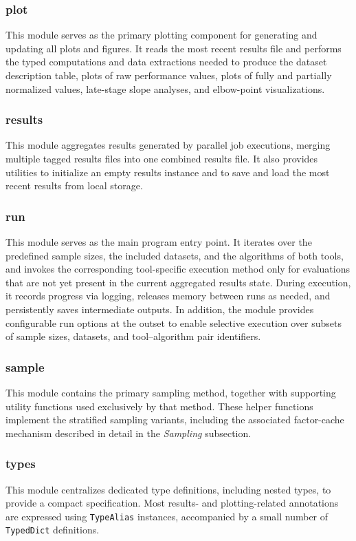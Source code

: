 \documentclass[12pt,a4paper]{article}
\begin{document}
\subsubsection{plot}
This module serves as the primary plotting component for generating and updating all plots and figures. It reads the most recent results file and performs the typed computations and data extractions needed to produce the dataset description table, plots of raw performance values, plots of fully and partially normalized values, late-stage slope analyses, and elbow-point visualizations.

\subsubsection{results}
This module aggregates results generated by parallel job executions, merging multiple tagged results files into one combined results file. It also provides utilities to initialize an empty results instance and to save and load the most recent results from local storage.

\subsubsection{run}
This module serves as the main program entry point. It iterates over the predefined sample sizes, the included datasets, and the algorithms of both tools, and invokes the corresponding tool-specific execution method only for evaluations that are not yet present in the current aggregated results state. During execution, it records progress via logging, releases memory between runs as needed, and persistently saves intermediate outputs. In addition, the module provides configurable run options at the outset to enable selective execution over subsets of sample sizes, datasets, and tool--algorithm pair identifiers.

\subsubsection{sample}
This module contains the primary sampling method, together with supporting utility functions used exclusively by that method. These helper functions implement the stratified sampling variants, including the associated factor-cache mechanism described in detail in the \emph{Sampling} subsection.

\subsubsection{types}
This module centralizes dedicated type definitions, including nested types, to provide a compact specification. Most results- and plotting-related annotations are expressed using \texttt{TypeAlias} instances, accompanied by a small number of \texttt{TypedDict} definitions.
\end{document}
